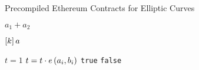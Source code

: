 \begin{algorithm}[t]
\caption{Precompiled Ethereum Contracts for Elliptic Curves}
\label{alg:ec_algs}
\begin{algorithmic}[1]
    \State \Return $a_{1}+a_{2}$
\EndFunction

\State
{}
    \State \Return $\left[ k \right]a$
\EndFunction

\State
    \State $t=1$
        \State $t = t\cdot e\left( a_{i},b_{i} \right)$
    \EndFor
        \State \Return \texttt{true}
    \Else
        \State \Return \texttt{false}
    \EndIf
\EndFunction

\end{algorithmic}
\end{algorithm}
